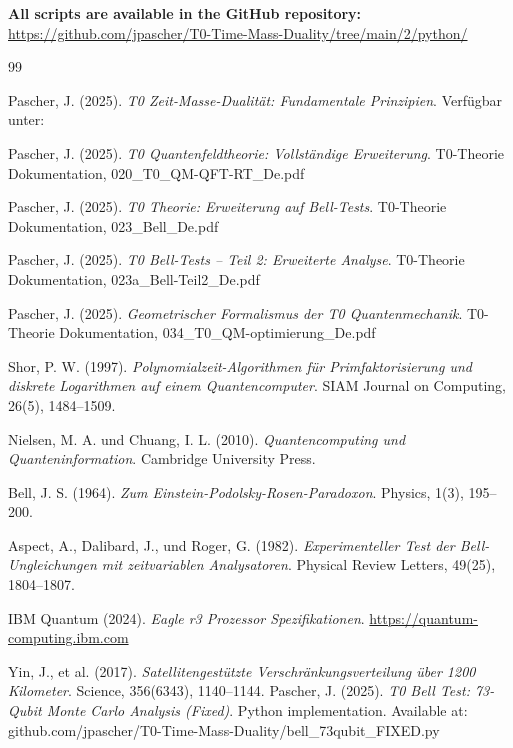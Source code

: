 \textbf{All scripts are available in the GitHub repository:} \\
\url{https://github.com/jpascher/T0-Time-Mass-Duality/tree/main/2/python/}
\begin{thebibliography}{99}
	
	Pascher, J. (2025). 
	\textit{T0 Zeit-Masse-Dualität: Fundamentale Prinzipien}. 
	Verfügbar unter: 
	
	Pascher, J. (2025). 
	\textit{T0 Quantenfeldtheorie: Vollständige Erweiterung}. 
	T0-Theorie Dokumentation, 020\_T0\_QM-QFT-RT\_De.pdf
	
	Pascher, J. (2025). 
	\textit{T0 Theorie: Erweiterung auf Bell-Tests}. 
	T0-Theorie Dokumentation, 023\_Bell\_De.pdf
	
	Pascher, J. (2025). 
	\textit{T0 Bell-Tests -- Teil 2: Erweiterte Analyse}. 
	T0-Theorie Dokumentation, 023a\_Bell-Teil2\_De.pdf
	
	Pascher, J. (2025). 
	\textit{Geometrischer Formalismus der T0 Quantenmechanik}. 
	T0-Theorie Dokumentation, 034\_T0\_QM-optimierung\_De.pdf
	
	Shor, P. W. (1997). 
	\textit{Polynomialzeit-Algorithmen für Primfaktorisierung und diskrete Logarithmen auf einem Quantencomputer}. 
	SIAM Journal on Computing, 26(5), 1484--1509.
	
	Nielsen, M. A. und Chuang, I. L. (2010). 
	\textit{Quantencomputing und Quanteninformation}. 
	Cambridge University Press.
	
	Bell, J. S. (1964). 
	\textit{Zum Einstein-Podolsky-Rosen-Paradoxon}. 
	Physics, 1(3), 195--200.
	
	Aspect, A., Dalibard, J., und Roger, G. (1982). 
	\textit{Experimenteller Test der Bell-Ungleichungen mit zeitvariablen Analysatoren}. 
	Physical Review Letters, 49(25), 1804--1807.
	
	IBM Quantum (2024). 
	\textit{Eagle r3 Prozessor Spezifikationen}. 
	\url{https://quantum-computing.ibm.com}
	
	Yin, J., et al. (2017). 
	\textit{Satellitengestützte Verschränkungsverteilung über 1200 Kilometer}. 
	Science, 356(6343), 1140--1144.
	Pascher, J. (2025). 
	\textit{T0 Bell Test: 73-Qubit Monte Carlo Analysis (Fixed)}. 
	Python implementation. Available at: github.com/jpascher/T0-Time-Mass-Duality/bell\_73qubit\_FIXED.py
	

\end{thebibliography}
